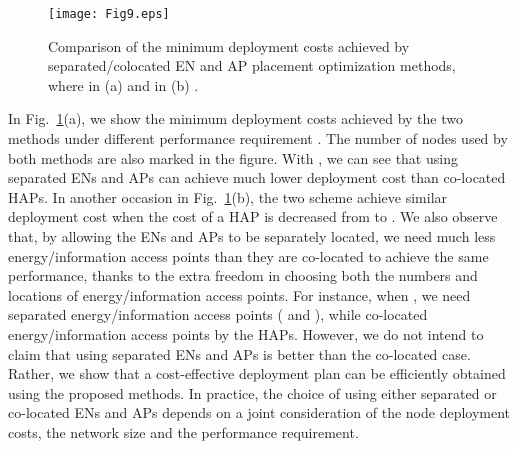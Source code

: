 \documentclass[journal, draftcls, one column, 12pt]{IEEEtran}
\begin{document}
\begin{figure}
\centering
  \begin{center}
    \texttt{[image: Fig9.eps]}
  \end{center}
  \caption{Comparison of the minimum deployment costs achieved by separated/colocated EN and AP placement optimization methods, where in (a)  and in (b) . }
  \label{72}
\end{figure}

In Fig.~\ref{72}(a), we show the minimum deployment costs achieved by the two methods under different performance requirement . The number of nodes used by both methods are also marked in the figure. With , we can see that using separated ENs and APs can achieve much lower deployment cost than co-located HAPs. In another occasion in Fig.~\ref{72}(b), the two scheme achieve similar deployment cost when the cost of a HAP is decreased from  to . We also observe that, by allowing the ENs and APs to be separately located, we need much less energy/information access points than they are co-located to achieve the same performance, thanks to the extra freedom in choosing both the numbers and locations of energy/information access points. For instance, when , we need  separated energy/information access points ( and ), while  co-located energy/information access points by the  HAPs. However, we do not intend to claim that using separated ENs and APs is better than the co-located case. Rather, we show that a cost-effective deployment plan can be efficiently obtained using the proposed methods. In practice, the choice of using either separated or co-located ENs and APs depends on a joint consideration of the node deployment costs, the network size and the performance requirement.
\end{document}
